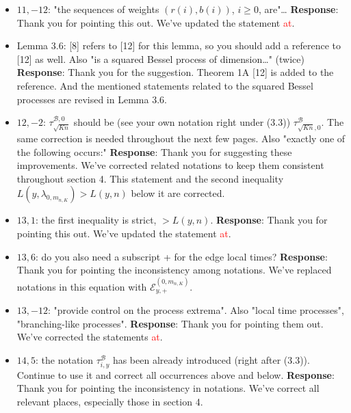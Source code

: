 \documentclass[11pt,a4paper]{article}
\numberwithin{equation}{section}
\def\TBF#1{\textcolor{red}{#1}} %
\begin{document}
\begin{itemize}
		
		\item 
		$11,-12$: "the sequences of weights $(r(i), b(i))$, $i \geq 0$, are"\dots
		\subitem \textbf{Response}: Thank you for pointing this out.  We've updated the statement \TBF{at}. 
		
		\item 
		Lemma 3.6: [8] refers to [12] for this lemma, so you should add a reference to [12] as well. Also "is a squared Bessel process of dimension\dots " (twice)
		\subitem \textbf{Response}: Thank you for the suggestion. Theorem 1A [12] is added to the reference. And the mentioned statements related to the squared Bessel processes are revised in Lemma 3.6. 
		
		
		\item 
		$12,-2$: $\tau^{\mathcal{B},0}_{\sqrt{Kn}}$ should be (see your own notation right under (3.3)) $\tau^{\mathcal{B}}_{\sqrt{Kn},0}$. The same correction is
		needed throughout the next few pages. Also "exactly one of the following occurs:"
		\subitem \textbf{Response}:  Thank you for suggesting these improvements. We've corrected related notations to keep them consistent throughout section 4. This statement and the second inequality $L(y, \lambda_{0,m_{n,K}} )>L(y,n)$ below it are corrected.
		
		\item 
		$13,1$: the first inequality is strict, $> L(y, n)$.
		\subitem \textbf{Response}: Thank you for pointing this out.  We've updated the statement \TBF{at}.
		
		\item 
		$13,6$: do you also need a subscript + for the edge local times?
		\subitem \textbf{Response}: Thank you for pointing the inconsistency among notations. We've replaced notations in this equation with $\mathcal{E}_{y,+}^{(0,m_{n,K})}  $.
		
		\item 
		$13,-12$: "provide control on the process extrema". Also "local time processes", "branching-like processes".
		\subitem \textbf{Response}: Thank you for pointing them out.  We've corrected the statements \TBF{at}. 
		
		\item 
		$14,5$: the notation $\tau^{\mathcal{B}}_{i,y}$ has been already introduced (right after (3.3)). Continue to use it and correct all occurrences above and below.
		\subitem \textbf{Response}: Thank you for pointing the inconsistency in notations. We've correct all relevant places, especially those in section 4. 
		

\end{itemize}
\end{document}

